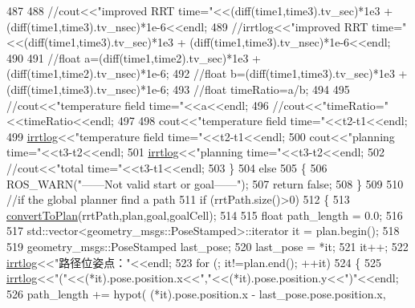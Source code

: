 \begin{DoxyCode}
{{{487 
488             \textcolor{comment}{//cout<<"improved RRT time="<<(diff(time1,time3).tv\_sec)*1e3 +
       (diff(time1,time3).tv\_nsec)*1e-6<<endl;}
489             \textcolor{comment}{//irrtlog<<"improved RRT time="<<(diff(time1,time3).tv\_sec)*1e3 +
       (diff(time1,time3).tv\_nsec)*1e-6<<endl;}
490 
491             \textcolor{comment}{//float a=(diff(time1,time2).tv\_sec)*1e3 + (diff(time1,time2).tv\_nsec)*1e-6;}
492             \textcolor{comment}{//float b=(diff(time1,time3).tv\_sec)*1e3 + (diff(time1,time3).tv\_nsec)*1e-6;}
493             \textcolor{comment}{//float timeRatio=a/b;}
494 
495             \textcolor{comment}{//cout<<"temperature field time="<<a<<endl;}
496             \textcolor{comment}{//cout<<"timeRatio="<<timeRatio<<endl;}
497             
498             cout<<\textcolor{stringliteral}{"temperature field time="}<<t2-t1<<endl;
499             \hyperlink{rrt__planner_8cpp_ae63d6003ff9416f7c0be6892e5bb899c}{irrtlog}<<\textcolor{stringliteral}{"temperature field time="}<<t2-t1<<endl;
500             cout<<\textcolor{stringliteral}{"planning time="}<<t3-t2<<endl;
501             \hyperlink{rrt__planner_8cpp_ae63d6003ff9416f7c0be6892e5bb899c}{irrtlog}<<\textcolor{stringliteral}{"planning time="}<<t3-t2<<endl;
502             \textcolor{comment}{//cout<<"total time="<<t3-t1<<endl;}
503     \}
504     \textcolor{keywordflow}{else}
505     \{
506         ROS\_WARN(\textcolor{stringliteral}{"------Not valid start or goal------"});
507         \textcolor{keywordflow}{return} \textcolor{keyword}{false};
508     \}
509 
510     \textcolor{comment}{//if the global planner find a path}
511     \textcolor{keywordflow}{if} (rrtPath.size()>0)
512     \{
513         \hyperlink{classrrt__plan_1_1rrt__planner_aac5e9f72b4c55ce4aada8d80eed92a9e}{convertToPlan}(rrtPath,plan,goal,goalCell);
514 
515         \textcolor{keywordtype}{float} path\_length = 0.0;
516 
517         std::vector<geometry\_msgs::PoseStamped>::iterator it = plan.begin();
518 
519         geometry\_msgs::PoseStamped last\_pose;
520         last\_pose = *it;
521         it++;
522         \hyperlink{rrt__planner_8cpp_ae63d6003ff9416f7c0be6892e5bb899c}{irrtlog}<<\textcolor{stringliteral}{"路径位姿点："}<<endl;
523         \textcolor{keywordflow}{for} (; it!=plan.end(); ++it)
524         \{
525             \hyperlink{rrt__planner_8cpp_ae63d6003ff9416f7c0be6892e5bb899c}{irrtlog}<<\textcolor{stringliteral}{"("}<<(*it).pose.position.x<<\textcolor{stringliteral}{","}<<(*it).pose.position.y<<\textcolor{stringliteral}{")"}<<endl;
526             path\_length += hypot(  (*it).pose.position.x - last\_pose.pose.position.x,
}}}
\end{DoxyCode}
